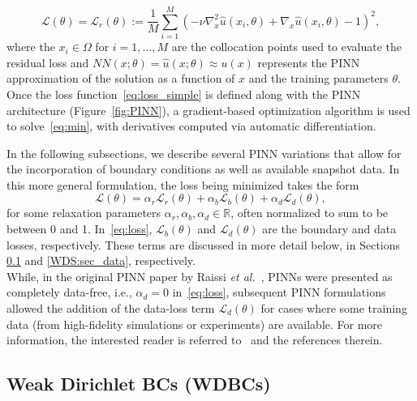 \documentclass[oneside,final]{csri23}
\begin{document}
\begin{equation} \label{eq:loss_simple}
     \mathcal{L}(\theta) = \mathcal{L}_r(\theta) := \frac{1}{M} \sum_{i=1}^M \left(-{\nu} \nabla_x^2 \hat{u}(x_i,\theta) + \nabla_x \hat{u}(x_i,\theta) - 1 \right)^2, 
\end{equation}
where the $x_i\in \Omega$ for $i=1,...,M$ are the collocation points used to evaluate the residual loss and $NN(x; \theta) = \hat{u}(x; \theta)\approx u(x)$ represents the PINN approximation of the solution as a function of $x$ and the training parameters $\theta$. Once the loss function~\eqref{eq:loss_simple} is defined along with the PINN architecture (Figure~\ref{fig:PINN}), a gradient-based optimization algorithm is used to solve~\eqref{eq:min}, with derivatives computed via automatic differentiation.

In the following subsections, we describe several PINN variations that allow for the incorporation of boundary conditions as well as available snapshot data.  In this more general formulation, the loss being minimized takes the form
\begin{equation} \label{eq:loss}
    \mathcal{L}(\theta) = \alpha_r \mathcal{L}_r(\theta) + \alpha_b \mathcal{L}_b(\theta) 
    + \alpha_d \mathcal{L}_d(\theta),
\end{equation}
for some relaxation parameters $\alpha_r, \alpha_b, \alpha_d \in \mathbb{R}$, often normalized to sum to be between 0 and 1. In~\eqref{eq:loss}, $\mathcal{L}_b(\theta)$ and $\mathcal{L}_d(\theta)$ are the boundary and data losses, respectively. These terms are discussed in more detail below, in Sections \ref{WDS:sec_WDBC} and \ref{WDS:sec_data}, respectively.  \\


  While, in the original PINN paper by Raissi \textit{et al.}~\cite{WDS:Raissi2019}, PINNs were presented as completely data-free, i.e., $\alpha_d = 0$ in~\eqref{eq:loss}, subsequent PINN formulations allowed the addition of the data-loss term $\mathcal{L}_d(\theta)$ for cases where some training data (from high-fidelity simulations or experiments) are available. For more information, the interested reader is referred to~\cite{WDS:Lawal2022, WDS:Hao2023physicsinformed} and the references therein. \\

\subsection{Weak Dirichlet BCs (WDBCs)}\label{WDS:sec_WDBC}
\end{document}
